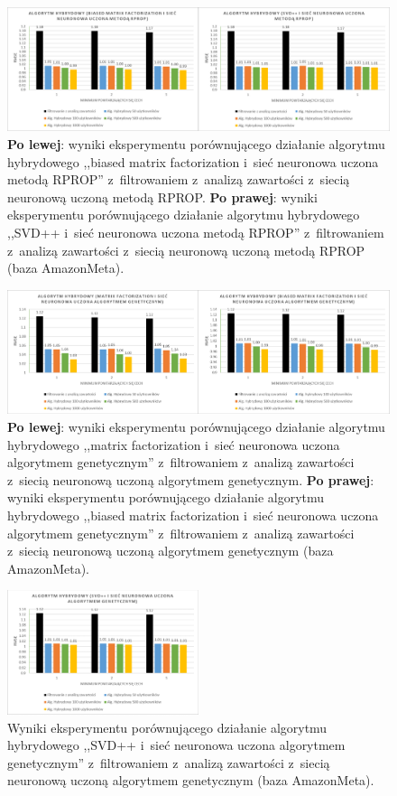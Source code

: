 \documentclass[twoside]{iisthesis}
\begin{document}
		\begin{figure}
			\centering
			\includegraphics[width=1\textwidth]{am_exphybrid1_3}			
			\caption{\textbf{Po lewej}: wyniki eksperymentu porównującego działanie algorytmu hybrydowego ,,biased matrix factorization i~sieć neuronowa uczona metodą RPROP'' z~filtrowaniem z~analizą zawartości z~siecią neuronową uczoną metodą RPROP. \textbf{Po prawej}: wyniki eksperymentu porównującego działanie algorytmu hybrydowego ,,SVD++ i~sieć neuronowa uczona metodą RPROP'' z~filtrowaniem z~analizą zawartości z~siecią neuronową uczoną metodą RPROP (baza AmazonMeta).}
			\label{fig:am_exphybrid1_3}
		\end{figure}
		
		\begin{figure}
			\centering
			\includegraphics[width=1\textwidth]{am_exphybrid1_4}			
			\caption{\textbf{Po lewej}: wyniki eksperymentu porównującego działanie algorytmu hybrydowego ,,matrix factorization i~sieć neuronowa uczona algorytmem genetycznym'' z~filtrowaniem z~analizą zawartości z~siecią neuronową uczoną algorytmem genetycznym. \textbf{Po prawej}: wyniki eksperymentu porównującego działanie algorytmu hybrydowego ,,biased matrix factorization i~sieć neuronowa uczona algorytmem genetycznym'' z~filtrowaniem z~analizą zawartości z~siecią neuronową uczoną algorytmem genetycznym (baza AmazonMeta).}
			\label{fig:am_exphybrid1_4}
		\end{figure}
		
		\begin{figure}
			\centering
			\includegraphics[width=0.5\textwidth]{am_exphybrid1_5}			
			\caption{Wyniki eksperymentu porównującego działanie algorytmu hybrydowego ,,SVD++ i~sieć neuronowa uczona algorytmem genetycznym'' z~filtrowaniem z~analizą zawartości z~siecią neuronową uczoną algorytmem genetycznym (baza AmazonMeta).}
			\label{fig:am_exphybrid1_5}
		\end{figure}
		
\end{document}
